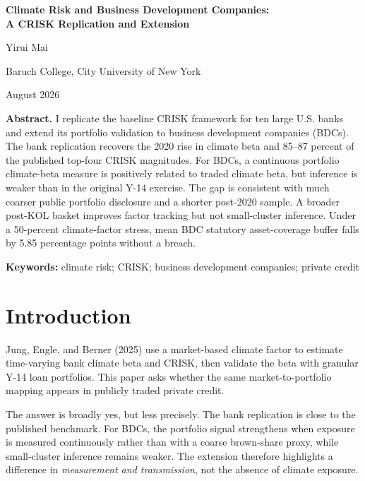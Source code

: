 \documentclass[11pt]{article}
\begin{document}
\begin{titlepage}
\thispagestyle{empty}
\centering
\vspace*{0.55in}
{\LARGE\bfseries Climate Risk and Business Development Companies:\\[0.08in]
A CRISK Replication and Extension\par}
\vspace{0.30in}
{\large Yirui Mai\par}
\vspace{0.06in}
{\normalsize Baruch College, City University of New York\par}
\vspace{0.14in}
{\normalsize August 2026\par}
\vfill
\begin{minipage}{0.84\textwidth}
\noindent\textbf{Abstract.}
I replicate the baseline CRISK framework for ten large U.S. banks and extend its portfolio validation to business development companies (BDCs). The bank replication recovers the 2020 rise in climate beta and 85--87 percent of the published top-four CRISK magnitudes. For BDCs, a continuous portfolio climate-beta measure is positively related to traded climate beta, but inference is weaker than in the original Y-14 exercise. The gap is consistent with much coarser public portfolio disclosure and a shorter post-2020 sample. A broader post-KOL basket improves factor tracking but not small-cluster inference. Under a 50-percent climate-factor stress, mean BDC statutory asset-coverage buffer falls by 5.85 percentage points without a breach.

\vspace{0.14in}
\noindent\textbf{Keywords:} climate risk; CRISK; business development companies; private credit
\end{minipage}
\vfill
\end{titlepage}

\section{Introduction}

Jung, Engle, and Berner (2025) use a market-based climate factor to estimate time-varying bank climate beta and CRISK, then validate the beta with granular Y-14 loan portfolios. This paper asks whether the same market-to-portfolio mapping appears in publicly traded private credit.

The answer is broadly yes, but less precisely. The bank replication is close to the published benchmark. For BDCs, the portfolio signal strengthens when exposure is measured continuously rather than with a coarse brown-share proxy, while small-cluster inference remains weaker. The extension therefore highlights a difference in \emph{measurement and transmission}, not the absence of climate exposure.
\end{document}
